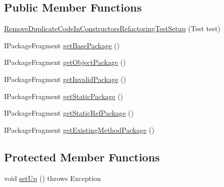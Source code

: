 \subsection*{Public Member Functions}
\begin{DoxyCompactItemize}
\item 
\hyperlink{classedu_1_1illinois_1_1canistelCassabanana_1_1tests_1_1RemoveDuplicateCodeInConstructorsRefactoringTestSetup_a911429a6dae252d1db02961e02a06363}{RemoveDuplicateCodeInConstructorsRefactoringTestSetup} (Test test)
\item 
IPackageFragment \hyperlink{classedu_1_1illinois_1_1canistelCassabanana_1_1tests_1_1RemoveDuplicateCodeInConstructorsRefactoringTestSetup_a9320d5036798a516db25bcc0124b1a4d}{getBasePackage} ()
\item 
IPackageFragment \hyperlink{classedu_1_1illinois_1_1canistelCassabanana_1_1tests_1_1RemoveDuplicateCodeInConstructorsRefactoringTestSetup_a964d770feb56d254688c849596745903}{getObjectPackage} ()
\item 
IPackageFragment \hyperlink{classedu_1_1illinois_1_1canistelCassabanana_1_1tests_1_1RemoveDuplicateCodeInConstructorsRefactoringTestSetup_a08ce006f74e53e825081facd2b82440a}{getInvalidPackage} ()
\item 
IPackageFragment \hyperlink{classedu_1_1illinois_1_1canistelCassabanana_1_1tests_1_1RemoveDuplicateCodeInConstructorsRefactoringTestSetup_a92b28041405ec4c2f63e932a9880962c}{getStaticPackage} ()
\item 
IPackageFragment \hyperlink{classedu_1_1illinois_1_1canistelCassabanana_1_1tests_1_1RemoveDuplicateCodeInConstructorsRefactoringTestSetup_a699a155fe6b736f75f64b550b2b988ee}{getStaticRefPackage} ()
\item 
IPackageFragment \hyperlink{classedu_1_1illinois_1_1canistelCassabanana_1_1tests_1_1RemoveDuplicateCodeInConstructorsRefactoringTestSetup_a311762fa9335a84f17ccadabcc5c83b1}{getExistingMethodPackage} ()
\end{DoxyCompactItemize}
\subsection*{Protected Member Functions}
\begin{DoxyCompactItemize}
\item 
void \hyperlink{classedu_1_1illinois_1_1canistelCassabanana_1_1tests_1_1RemoveDuplicateCodeInConstructorsRefactoringTestSetup_a40853b5ccdcb98e6ea413acea726102f}{setUp} ()  throws Exception 
\end{DoxyCompactItemize}
